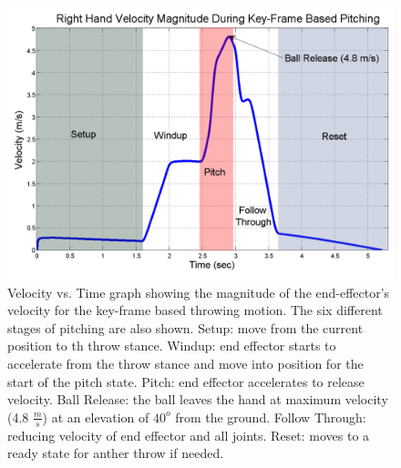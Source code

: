 \begin{figure}[t]
  \centering
\includegraphics[width=1.0\columnwidth]{./fig/keyFrameThrow4.pdf}
  \caption{Velocity vs. Time graph showing the magnitude of the end-effector's velocity for the key-frame based throwing motion.  The six different stages of pitching are also shown.  Setup: move from the current position to th throw stance.  Windup: end effector starts to accelerate from the throw stance and move into position for the start of the pitch state. Pitch: end effector accelerates to release velocity.  Ball Release: the ball leaves the hand at maximum velocity (4.8 $\frac{m}{s}$) at an elevation of $40^o$ from the ground.  Follow Through: reducing velocity of end effector and all joints.  Reset: moves to a ready state for anther throw if needed.}
  \label{fig:keyframe-graph}
\end{figure}
